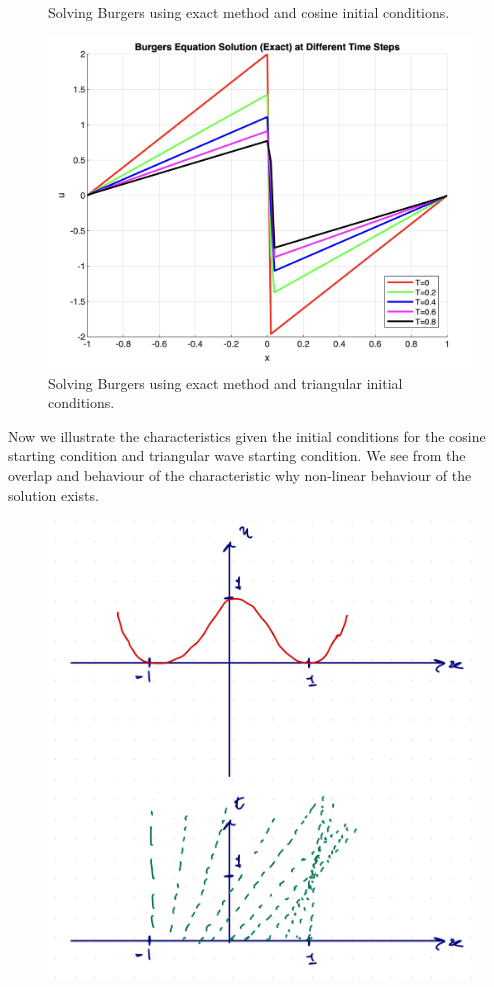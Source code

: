 \begin{solution}
\begin{figure}[H]
    \caption{Solving Burgers using exact method and cosine initial conditions.}
\end{figure}
\begin{figure}[H]
    \centering
    \includegraphics[scale=0.4]{./figures/q5-triangular.png}
    \caption{Solving Burgers using exact method and triangular initial conditions.}
\end{figure}
Now we illustrate the characteristics given the initial conditions for the cosine starting condition and triangular wave starting condition. We see from the overlap and behaviour of the characteristic why non-linear behaviour of the solution exists.
\begin{figure}[H]
    \centering
    \includegraphics[scale=0.21]{./figures/q5-cos-characteristic.png}

\end{figure}
\end{solution}

